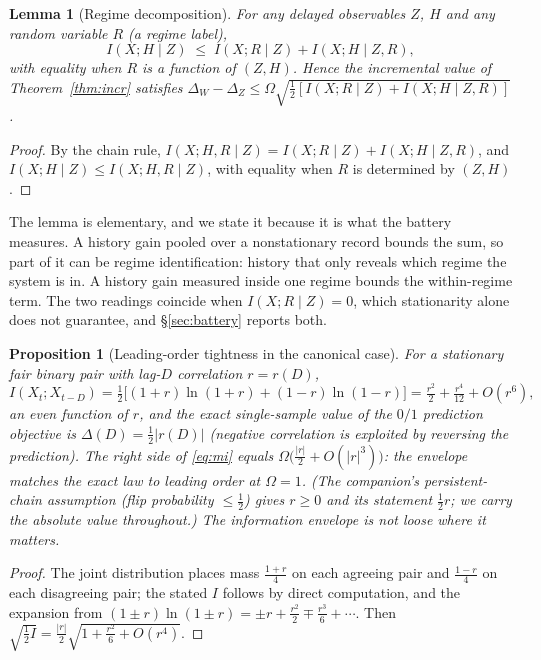 \documentclass[11pt]{article}
\newtheorem{proposition}[theorem]{Proposition}
\newtheorem{lemma}[theorem]{Lemma}
\begin{document}
\begin{lemma}[Regime decomposition]\label{lem:regime}
For any delayed observables $Z$, $H$ and any random variable $R$ (a regime
label),
\[
I(X;H\mid Z)\;\le\;I(X;R\mid Z)+I(X;H\mid Z,R),
\]
with equality when $R$ is a function of $(Z,H)$. Hence the incremental value
of Theorem~\ref{thm:incr} satisfies
$\Delta_W-\Delta_Z\le\Omega\sqrt{\tfrac12[I(X;R\mid Z)+I(X;H\mid Z,R)]}$.
\end{lemma}

\begin{proof}
By the chain rule, $I(X;H,R\mid Z)=I(X;R\mid Z)+I(X;H\mid Z,R)$,
and $I(X;H\mid Z)\le I(X;H,R\mid Z)$, with equality when $R$ is
determined by $(Z,H)$.
\end{proof}

The lemma is elementary, and we state it because it is what the battery
measures. A history gain pooled over a nonstationary record bounds the
sum, so part of it can be regime identification: history that only reveals
which regime the system is in. A history gain measured inside one regime
bounds the within-regime term. The two readings coincide when
$I(X;R\mid Z)=0$, which stationarity alone does not guarantee, and
\S\ref{sec:battery} reports both.

\begin{proposition}[Leading-order tightness in the canonical case]
\label{prop:tight}
For a stationary fair binary pair with lag-$D$ correlation $r=r(D)$,
\[
I(X_t;X_{t-D})=\tfrac12\bigl[(1{+}r)\ln(1{+}r)+(1{-}r)\ln(1{-}r)\bigr]
=\tfrac{r^2}{2}+\tfrac{r^4}{12}+O(r^6),
\]
an even function of $r$, and the exact single-sample value of the $0/1$
prediction objective is $\Delta(D)=\tfrac12|r(D)|$ (negative correlation is
exploited by reversing the prediction). The right side of \eqref{eq:mi}
equals $\Omega\bigl(\tfrac{|r|}2+O(|r|^3)\bigr)$: the envelope matches the
exact law to leading order at $\Omega=1$. (The companion's persistent-chain
assumption (flip probability $\le\tfrac12$) gives $r\ge 0$ and its
statement $\tfrac12 r$; we carry the absolute value throughout.) The
information envelope is not loose where it matters.
\end{proposition}

\begin{proof}
The joint distribution places mass $\tfrac{1+r}{4}$ on each agreeing pair and
$\tfrac{1-r}{4}$ on each disagreeing pair; the stated $I$ follows by direct
computation, and the expansion from
$(1\pm r)\ln(1\pm r)=\pm r+\tfrac{r^2}{2}\mp\tfrac{r^3}{6}+\cdots$. Then
$\sqrt{\tfrac12 I}=\tfrac{|r|}2\sqrt{1+\tfrac{r^2}{6}+O(r^4)}$.
\end{proof}
\end{document}
